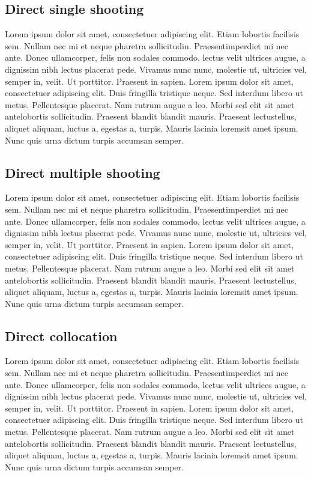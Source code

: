 \subsection{Direct single shooting}

Lorem ipsum dolor sit amet, consectetuer adipiscing elit. Etiam lobortis facilisis sem. Nullam nec mi et neque pharetra sollicitudin. Praesentimperdiet mi nec ante. Donec ullamcorper, felis non sodales commodo, lectus velit ultrices augue, a dignissim nibh lectus placerat pede. Vivamus nunc nunc, molestie ut, ultricies vel, semper in, velit. Ut porttitor. Praesent in sapien. Lorem ipsum dolor sit amet, consectetuer adipiscing elit. Duis fringilla tristique neque. Sed interdum libero ut metus. Pellentesque placerat. Nam rutrum augue a leo. Morbi sed elit sit amet antelobortis sollicitudin. Praesent blandit blandit mauris. Praesent lectustellus, aliquet aliquam, luctus a, egestas a, turpis. Mauris lacinia loremsit amet ipsum. Nunc quis urna dictum turpis accumsan semper.

\subsection{Direct multiple shooting}

Lorem ipsum dolor sit amet, consectetuer adipiscing elit. Etiam lobortis facilisis sem. Nullam nec mi et neque pharetra sollicitudin. Praesentimperdiet mi nec ante. Donec ullamcorper, felis non sodales commodo, lectus velit ultrices augue, a dignissim nibh lectus placerat pede. Vivamus nunc nunc, molestie ut, ultricies vel, semper in, velit. Ut porttitor. Praesent in sapien. Lorem ipsum dolor sit amet, consectetuer adipiscing elit. Duis fringilla tristique neque. Sed interdum libero ut metus. Pellentesque placerat. Nam rutrum augue a leo. Morbi sed elit sit amet antelobortis sollicitudin. Praesent blandit blandit mauris. Praesent lectustellus, aliquet aliquam, luctus a, egestas a, turpis. Mauris lacinia loremsit amet ipsum. Nunc quis urna dictum turpis accumsan semper.

\subsection{Direct collocation}

Lorem ipsum dolor sit amet, consectetuer adipiscing elit. Etiam lobortis facilisis sem. Nullam nec mi et neque pharetra sollicitudin. Praesentimperdiet mi nec ante. Donec ullamcorper, felis non sodales commodo, lectus velit ultrices augue, a dignissim nibh lectus placerat pede. Vivamus nunc nunc, molestie ut, ultricies vel, semper in, velit. Ut porttitor. Praesent in sapien. Lorem ipsum dolor sit amet, consectetuer adipiscing elit. Duis fringilla tristique neque. Sed interdum libero ut metus. Pellentesque placerat. Nam rutrum augue a leo. Morbi sed elit sit amet antelobortis sollicitudin. Praesent blandit blandit mauris. Praesent lectustellus, aliquet aliquam, luctus a, egestas a, turpis. Mauris lacinia loremsit amet ipsum. Nunc quis urna dictum turpis accumsan semper.


